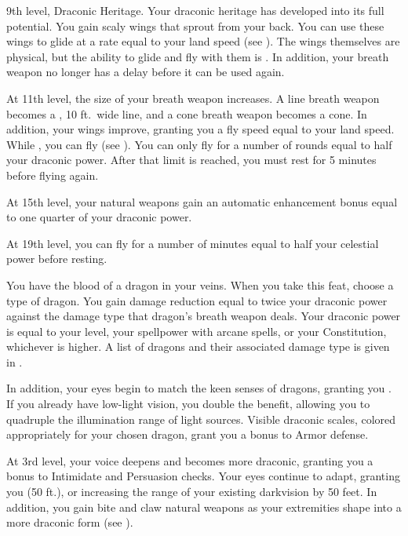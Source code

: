     \featpres 9th level, Draconic Heritage.
    \featben Your draconic heritage has developed into its full potential.
    You gain scaly wings that sprout from your back.
    You can use these wings to glide at a rate equal to your land speed (see ).
    The wings themselves are physical, but the ability to glide and fly with them is .
    In addition, your breath weapon no longer has a delay before it can be used again.

    At 11th level, the size of your breath weapon increases.
    A line breath weapon becomes a \areahuge, 10 ft.\ wide line, and a cone breath weapon becomes a \arealarge cone.
    In addition, your wings improve, granting you a fly speed equal to your land speed.
    While , you can fly (see ).
    You can only fly for a number of rounds equal to half your draconic power.
    After that limit is reached, you must rest for 5 minutes before flying again.

    At 15th level, your natural weapons gain an automatic enhancement bonus equal to one quarter of your draconic power. \magical

    At 19th level, you can fly for a number of minutes equal to half your celestial power before resting. \magical

    \featben You have the blood of a dragon in your veins.
    When you take this feat, choose a type of dragon.
    You gain damage reduction equal to twice your draconic power against the damage type that dragon's breath weapon deals.
    Your draconic power is equal to your level, your spellpower with arcane spells, or your Constitution, whichever is higher.
    A list of dragons and their associated damage type is given in .

    In addition, your eyes begin to match the keen senses of dragons, granting you .
    If you already have low-light vision, you double the benefit, allowing you to quadruple the illumination range of light sources.
    Visible draconic scales, colored appropriately for your chosen dragon, grant you a  bonus to Armor defense.

    At 3rd level, your voice deepens and becomes more draconic, granting you a  bonus to Intimidate and Persuasion checks.
    Your eyes continue to adapt, granting you  (50 ft.), or increasing the range of your existing darkvision by 50 feet.
    In addition, you gain bite and claw natural weapons as your extremities shape into a more draconic form (see ).

